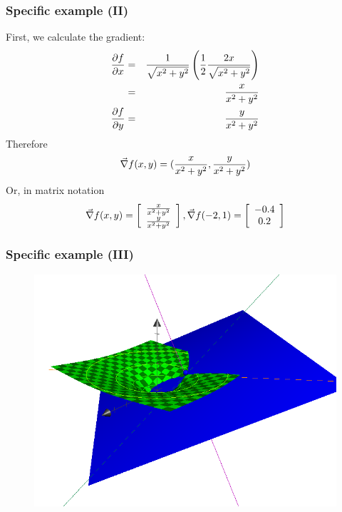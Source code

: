 \documentclass[hyperref={colorlinks=true}]{beamer}
\begin{document}

\begin{frame}%
  \frametitle{Specific example (II)}

  First, we calculate the gradient:
  \begin{eqnarray}
    \frac{\partial f}{\partial x} &=& \frac{1}{\sqrt{x^2 + y^2}} \left( \frac{1}{2} \frac{2x}{\sqrt{x^2 + y^2}}  \right) \\
                 &=& \frac{x}{x^2 + y^2} \\
    \frac{\partial f}{\partial y} &=& \frac{y}{x^2 + y^2}
  \end{eqnarray}
  Therefore
  \begin{equation}
    \vec{\nabla} f(x,y) = (\frac{x}{x^2 + y^2} , \frac{y}{x^2 + y^2})
  \end{equation}
  Or, in matrix notation
  \begin{equation}
    \vec{\nabla} f(x,y) = \left[\begin{array}{c}
                             \frac{x}{x^2 + y^2} \\
                             \frac{y}{x^2 + y^2}
                           \end{array}\right], 
    \vec{\nabla} f(-2,1) = \left[\begin{array}{c}
                             -0.4 \\
                             0.2
                           \end{array}\right]                     
  \end{equation}

\end{frame}


\begin{frame}%
  \frametitle{Specific example (III)}

  \begin{figure}
    \centering
    \includegraphics[width=0.85\columnwidth]{Function1-plane.png}
  \end{figure}

\end{frame}
\end{document}

